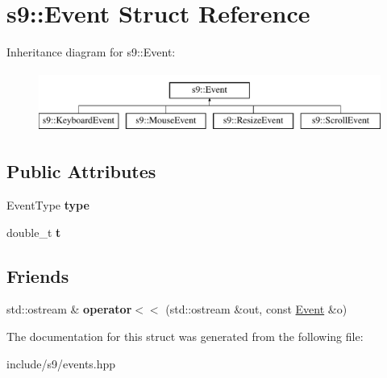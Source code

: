 \hypertarget{structs9_1_1Event}{\section{s9\-:\-:\-Event \-Struct \-Reference}
\label{structs9_1_1Event}
}
\-Inheritance diagram for s9\-:\-:\-Event\-:\begin{figure}[H]
\begin{center}
\leavevmode
\includegraphics[height=2.000000cm]{structs9_1_1Event}
\end{center}
\end{figure}
\subsection*{\-Public \-Attributes}
\begin{DoxyCompactItemize}
\item 
\hypertarget{structs9_1_1Event_ac6d2a02aeab6cd0c5ffd05d67fcb71f0}{\-Event\-Type {\bfseries type}}\label{structs9_1_1Event_ac6d2a02aeab6cd0c5ffd05d67fcb71f0}

\item 
\hypertarget{structs9_1_1Event_a600210822b48f7a2f88c9acb3f0d2088}{double\-\_\-t {\bfseries t}}\label{structs9_1_1Event_a600210822b48f7a2f88c9acb3f0d2088}

\end{DoxyCompactItemize}
\subsection*{\-Friends}
\begin{DoxyCompactItemize}
\item 
\hypertarget{structs9_1_1Event_a7789ff8e8663c0ff98d2758bbf41116e}{std\-::ostream \& {\bfseries operator$<$$<$} (std\-::ostream \&out, const \hyperlink{structs9_1_1Event}{\-Event} \&o)}\label{structs9_1_1Event_a7789ff8e8663c0ff98d2758bbf41116e}

\end{DoxyCompactItemize}


\-The documentation for this struct was generated from the following file\-:\begin{DoxyCompactItemize}
\item 
include/s9/events.\-hpp\end{DoxyCompactItemize}
